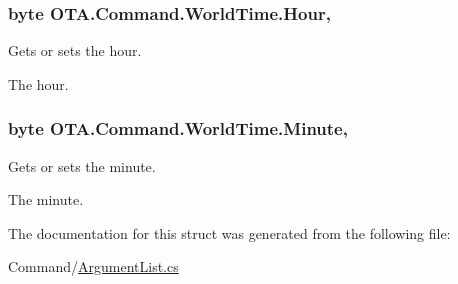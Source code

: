 \subsubsection[{Hour}]{\setlength{\rightskip}{0pt plus 5cm}byte O\+T\+A.\+Command.\+World\+Time.\+Hour\hspace{0.3cm}{\ttfamily [get]}, {\ttfamily [set]}}\label{struct_o_t_a_1_1_command_1_1_world_time_a5b31766a1acd5d3f7f6deb12883cd1a9}


Gets or sets the hour. 

The hour.\hypertarget{struct_o_t_a_1_1_command_1_1_world_time_a7deec67732fa18d400ee5e78627721e2}{}
\subsubsection[{Minute}]{\setlength{\rightskip}{0pt plus 5cm}byte O\+T\+A.\+Command.\+World\+Time.\+Minute\hspace{0.3cm}{\ttfamily [get]}, {\ttfamily [set]}}\label{struct_o_t_a_1_1_command_1_1_world_time_a7deec67732fa18d400ee5e78627721e2}


Gets or sets the minute. 

The minute.

The documentation for this struct was generated from the following file\+:\begin{DoxyCompactItemize}
\item 
Command/\hyperlink{_argument_list_8cs}{Argument\+List.\+cs}\end{DoxyCompactItemize}
